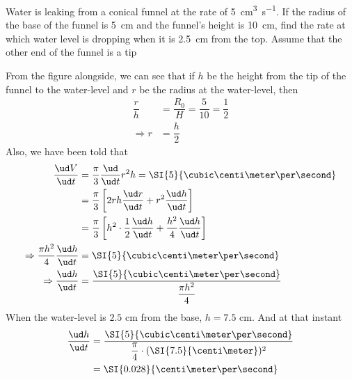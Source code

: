 

\question[3]  Water is leaking from a conical funnel at the rate of \SI{5}{\cubic\centi\metre\per\second}.
If the radius of the base of the funnel is \SI{5}{\centi\meter} and the funnel's height is 
\SI{10}{\centi\meter}, find the rate at which water level is dropping when it is 
\SI{2.5}{\centi\meter} from the top. Assume that the other end of the funnel is a tip


\ifprintanswers
\fi 

\begin{solution}[\fullpage]
	From the figure alongside, we can see that if 
	$h$ be the height from the tip of the funnel to the water-level and $r$
	be the radius at the water-level, then 
	\begin{align}
		\dfrac{r}{h} &= \dfrac{R_0}{H} = \dfrac{5}{10} = \dfrac{1}{2} \\
		\Rightarrow r &= \dfrac{h}{2}
	\end{align}
	Also, we have been told that 
	\begin{align}
		\dfrac{\ud V}{\ud t} &= \dfrac{\pi}{3}\dfrac{\ud}{\ud t}r^2h = \SI{5}{\cubic\centi\meter\per\second} \\
		&= \dfrac{\pi}{3}\left[2rh\dfrac{\ud r}{\ud t} + r^2\dfrac{\ud h}{\ud t}\right] \\
		&= \dfrac{\pi}{3}\left[h^2\cdot\dfrac{1}{2}\dfrac{\ud h}{\ud t} + \dfrac{h^2}{4}\dfrac{\ud h}{\ud t} \right] \\
		\Rightarrow \dfrac{\pi h^2}{4}\dfrac{\ud h}{\ud t} &= \SI{5}{\cubic\centi\meter\per\second} \\
		\Rightarrow \dfrac{\ud h}{\ud t} &= \dfrac{\SI{5}{\cubic\centi\meter\per\second}}
		{\dfrac{\pi h^2}{4}}
	\end{align}
	When the water-level is $2.5$ cm from the base, $h = 7.5$ cm. And at that instant
	\begin{align}
		\dfrac{\ud h}{\ud t} &= \dfrac{\SI{5}{\cubic\centi\meter\per\second}}
		{\dfrac{\pi}{4}\cdot(\SI{7.5}{\centi\meter})^2} \\
		&= \SI{0.028}{\centi\meter\per\second}
	\end{align}
\end{solution}
